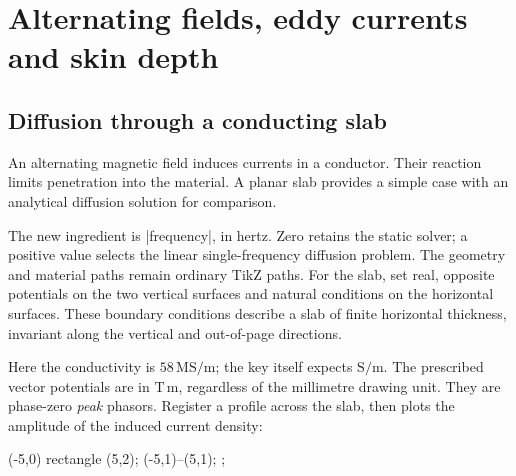 \section{Alternating fields, eddy currents and skin depth}
\label{sec:harmonic}

\subsection{Diffusion through a conducting slab}
An alternating magnetic field induces currents in a conductor. Their reaction
limits penetration into the material. A planar slab provides a simple case
with an analytical diffusion solution for comparison.

The new ingredient is |frequency|, in hertz. Zero retains the static solver;
a positive value selects the linear single-frequency diffusion problem.
The geometry and material paths remain ordinary TikZ paths. For the slab,
set real, opposite potentials on the two vertical surfaces and natural
conditions on the horizontal surfaces. These boundary conditions describe a slab of finite horizontal thickness,
invariant along the vertical and out-of-page directions.
\begin{codeexample}
\end{codeexample}
Here the conductivity is $58\,\mathrm{MS/m}$; the key itself expects
$\mathrm{S/m}$. The prescribed vector potentials are in $\mathrm{T\,m}$,
regardless of the millimetre drawing unit. They are phase-zero \emph{peak}
phasors. Register a profile across the slab, then plots the amplitude
of the induced current density:
\begin{codeexample}
\filldraw[fill=orange!20,
  femm/region={material=slab copper}] (-5,0) rectangle (5,2);
\path[femm/profile={name=skin,samples=101}] (-5,1)--(5,1);
;
\femmplot[profile=skin,component=Jeddy,abscissa=x,
  representation=amplitude]
\end{codeexample}

